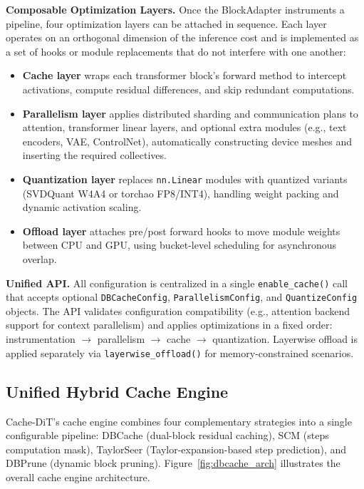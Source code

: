 \documentclass[10pt]{article}
\begin{document}
\textbf{Composable Optimization Layers.} Once the BlockAdapter instruments a pipeline, four optimization layers can be attached in sequence. Each layer operates on an orthogonal dimension of the inference cost and is implemented as a set of hooks or module replacements that do not interfere with one another:

\begin{itemize}
    \item \textbf{Cache layer} wraps each transformer block's forward method to intercept activations, compute residual differences, and skip redundant computations.
    \item \textbf{Parallelism layer} applies distributed sharding and communication plans to attention, transformer linear layers, and optional extra modules (e.g., text encoders, VAE, ControlNet), automatically constructing device meshes and inserting the required collectives.
    \item \textbf{Quantization layer} replaces \texttt{nn.Linear} modules with quantized variants (SVDQuant W4A4 or torchao FP8/INT4), handling weight packing and dynamic activation scaling.
    \item \textbf{Offload layer} attaches pre/post forward hooks to move module weights between CPU and GPU, using bucket-level scheduling for asynchronous overlap.
\end{itemize}

\textbf{Unified API.} All configuration is centralized in a single \texttt{enable\_cache()} call that accepts optional \texttt{DBCacheConfig}, \texttt{ParallelismConfig}, and \texttt{QuantizeConfig} objects. The API validates configuration compatibility (e.g., attention backend support for context parallelism) and applies optimizations in a fixed order: instrumentation $\rightarrow$ parallelism $\rightarrow$ cache $\rightarrow$ quantization. Layerwise offload is applied separately via \texttt{layerwise\_offload()} for memory-constrained scenarios.

\subsection{Unified Hybrid Cache Engine}

Cache-DiT's cache engine combines four complementary strategies into a single configurable pipeline: DBCache (dual-block residual caching), SCM (steps computation mask), TaylorSeer (Taylor-expansion-based step prediction), and DBPrune (dynamic block pruning). Figure~\ref{fig:dbcache_arch} illustrates the overall cache engine architecture.
\end{document}
